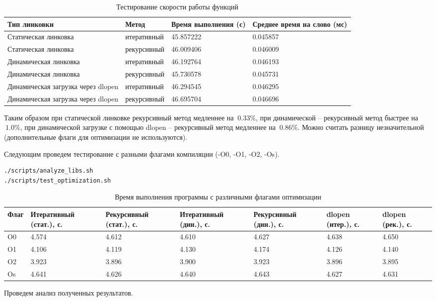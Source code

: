 \documentclass[14pt]{extreport}
\begin{document}
{\begin{table}[H]
\centering
\renewcommand{\tablename}{\small{Таблица.}}
\caption{\small Тестирование скорости работы функций}
\label{tab3}
\begin{tabular}{|p{4cm}|p{3cm}|p{4cm}|p{4cm}|}
    \hline
    Тип линковки & Метод & Время выполнения (с)	& Среднее время на слово (мс) \\
    \hline
    Статическая линковка & итеративный & 45.857222 & 0.045857 \\
    \hline
    Статическая линковка & рекурсивный & 46.009406 & 0.046009 \\
    \hline
    Динамическая линковка & итеративный & 46.192764 & 0.046193 \\
    \hline
    Динамическая линковка & рекурсивный & 45.730578 & 0.045731 \\
    \hline
    Динамическая загрузка через dlopen & итеративный & 46.294545 & 0.046295 \\
    \hline
    Динамическая загрузка через dlopen & рекурсивный & 46.695704 & 0.046696\\
    \hline
\end{tabular}
\end{table}
Таким образом при статической линковке рекурсивный метод медленнее на $~0.33\%$, при динамической -- рекурсивный метод быстрее на $~1.0\%$, при динамической загрузке с помощью dlopen -- рекурсивный метод медленнее на $~0.86\%$.
Можно считать разницу незначительной (дополнительные флаги для оптимизации не используются).

Следующим проведем тестирование с разными флагами компиляции (-O0, -O1, -O2, -Os).
\begin{verbatim}
./scripts/analyze_libs.sh  
./scripts/test_optimization.sh 
\end{verbatim}

\begin{table}[H]
\centering
\renewcommand{\tablename}{\small{Таблица.}}
\caption{\small Время выполнения программы с различными флагами оптимизации}
\label{tab4}
\begin{small}
    \begin{tabular}{|p{1cm}|p{2.5cm}|p{2.5cm}|p{2.5cm}|p{2.5cm}|p{2.5cm}|p{2.5cm}|}
    \hline
    Флаг & Итеративный (стат.), с. & Рекурсивный (стат.), с. & Итеративный (дин.), с. & Рекурсивный (дин.), с. & dlopen (итер.), с. & dlopen (рек.), с. \\
    \hline
    O0 & 4.574 & 4.612 & 4.610 & 4.627 & 4.638 & 4.650 \\
    \hline
    O1 & 4.106 & 4.119 & 4.130 & 4.174 & 4.126 & 4.140 \\
    \hline
    O2 & 3.923 & 3.896 & 3.900 & 3.923 & 3.896 & 3.895 \\
    \hline
    Os & 4.641 & 4.626 & 4.640 & 4.643 & 4.627 & 4.631 \\
    \hline
\end{tabular}
\end{small}
\end{table}
Проведем анализ полученных результатов.

}
\end{document}
